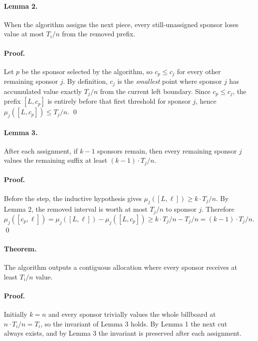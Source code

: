 \documentclass[11pt]{article}
\begin{document}
\paragraph{Lemma 2.}
When the algorithm assigns the next piece, every still-unassigned sponsor loses value at most $T_i / n$
from the removed prefix.

\paragraph{Proof.}
Let $p$ be the sponsor selected by the algorithm, so $c_p \le c_j$ for every other remaining sponsor $j$.
By definition, $c_j$ is the \emph{smallest} point where sponsor $j$ has accumulated value exactly $T_j/n$
from the current left boundary. Since $c_p \le c_j$, the prefix $[L,c_p]$ is entirely before that first
threshold for sponsor $j$, hence $\mu_j([L,c_p]) \le T_j/n$. \qed

\paragraph{Lemma 3.}
After each assignment, if $k-1$ sponsors remain, then every remaining sponsor $j$ values the remaining
suffix at least $(k-1) \cdot T_j / n$.

\paragraph{Proof.}
Before the step, the inductive hypothesis gives $\mu_j([L,\ell]) \ge k \cdot T_j / n$. By Lemma 2,
the removed interval is worth at most $T_j/n$ to sponsor $j$. Therefore
\[
\mu_j([c_p,\ell]) = \mu_j([L,\ell]) - \mu_j([L,c_p])
\ge k \cdot T_j / n - T_j / n
= (k-1) \cdot T_j / n.
\]
\qed

\paragraph{Theorem.}
The algorithm outputs a contiguous allocation where every sponsor receives at least $T_i / n$ value.

\paragraph{Proof.}
Initially $k=n$ and every sponsor trivially values the whole billboard at $n \cdot T_i / n = T_i$, so the
invariant of Lemma 3 holds. By Lemma 1 the next cut always exists, and by Lemma 3 the invariant is
preserved after each assignment.
\end{document}
